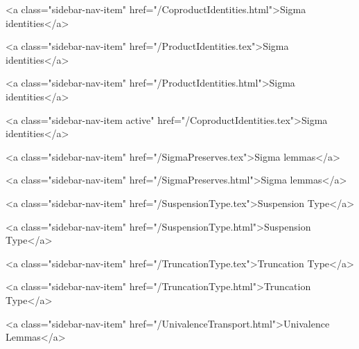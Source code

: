       
    
      
        
          <a class="sidebar-nav-item" href="/CoproductIdentities.html">Sigma identities</a>
        
      
    
      
        
          <a class="sidebar-nav-item" href="/ProductIdentities.tex">Sigma identities</a>
        
      
    
      
        
          <a class="sidebar-nav-item" href="/ProductIdentities.html">Sigma identities</a>
        
      
    
      
        
          <a class="sidebar-nav-item active" href="/CoproductIdentities.tex">Sigma identities</a>
        
      
    
      
        
          <a class="sidebar-nav-item" href="/SigmaPreserves.tex">Sigma lemmas</a>
        
      
    
      
        
          <a class="sidebar-nav-item" href="/SigmaPreserves.html">Sigma lemmas</a>
        
      
    
      
        
          <a class="sidebar-nav-item" href="/SuspensionType.tex">Suspension Type</a>
        
      
    
      
        
          <a class="sidebar-nav-item" href="/SuspensionType.html">Suspension Type</a>
        
      
    
      
        
          <a class="sidebar-nav-item" href="/TruncationType.tex">Truncation Type</a>
        
      
    
      
        
          <a class="sidebar-nav-item" href="/TruncationType.html">Truncation Type</a>
        
      
    
      
        
          <a class="sidebar-nav-item" href="/UnivalenceTransport.html">Univalence Lemmas</a>
        
